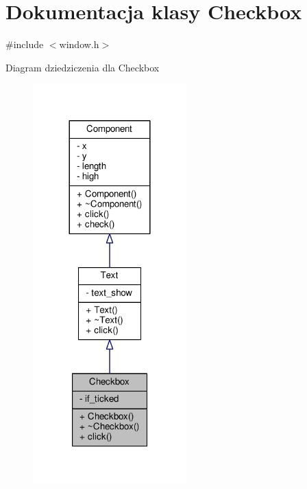 \hypertarget{classCheckbox}{}\section{Dokumentacja klasy Checkbox}
\label{classCheckbox}


{\ttfamily \#include $<$window.\+h$>$}



Diagram dziedziczenia dla Checkbox\nopagebreak
\begin{figure}[H]
\begin{center}
\leavevmode
\includegraphics[width=168pt]{classCheckbox__inherit__graph}
\end{center}
\end{figure}


